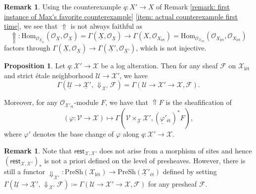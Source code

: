 \documentclass[11pt]{amsart}
\theoremstyle{definition}
\theoremstyle{definition}
\newtheorem{proposition}[theorem]{Proposition}
\newtheorem{remark}[theorem]{Remark}
\DeclareMathOperator{\arrowdown}{\!\Downarrow\!}
\newcommand{\cF}{\mathcal{F}}
\newcommand{\cO}{\mathcal{O}}
\newcommand{\cU}{\mathcal{U}}
\newcommand{\cV}{\mathcal{V}}
\newcommand{\cX}{\mathcal{X}}
\newcommand{\LogO}[1]{\mathcal{O}_{{#1}_\text{l\'et}}}
\newcommand{\ul}[1]{\underline{#1}}
\newcommand{\cal}{\mathcal}
\def\cF{{\cal F}}
\def\cO{{\cal O}}
\def\cU{{\cal U}}
\def\cV{{\cal V}}
\def\cX{{\cal X}}
\begin{document}
\begin{remark}
    Using the counterexample $q\colon X'\rightarrow X$ of Remark \ref{remark: first instance of Max's favorite counterexample} \eqref{item: actual counterexample first time}, we see that $\Uparrow$ is not always faithful as $$\Uparrow\colon \text{Hom}_{\cO_{\ul{X}_{\text{\'et}}}}(\cO_{\ul{X}},\cO_{\ul{X}}) = \Gamma(\ul{X},\cO_{\ul{X}})\longrightarrow \Gamma(X,\LogO{X}) = \text{Hom}_{\LogO{\cX}}(\LogO{X},\LogO{X})$$ factors through $\Gamma(\ul{X},\cO_{\ul{X}})\rightarrow \Gamma(\ul{X}',\cO_{\ul{X}'})$, which is not injective.
\end{remark}
\begin{proposition}\label{prop: explicit description of up and down}
Let $q\colon \mathcal{X'}\rightarrow \mathcal{X}$ be a log alteration. Then for any sheaf $\mathcal{F}$ on $\mathcal{X}_{\text{l\'et}}$ and strict \'etale neighborhood $\cU\rightarrow \mathcal{X'}$, we have 
\[\Gamma(\ul{\cU}\rightarrow \ul{\mathcal{X}}',\arrowdown_{\mathcal{X'}}\mathcal{F})=\Gamma(\cU\rightarrow \mathcal{X'}\rightarrow \mathcal{X},\mathcal{F}).\]

Moreover, for any $\mathcal{O}_{\ul{\mathcal{X}}'_{\text{\'et}}}$-module $F$, we have that $\Uparrow \!\! F$ is the sheafification of 
\[(\varphi\colon \cV\rightarrow\mathcal{X})\longmapsto \Gamma(\ul{\cV\times_\mathcal{X} \mathcal{X'}}, (\ul{\varphi}{}'_{\text{\'et}})^*{} F),\]
where $\varphi'$ denotes the base change of $\varphi$ along $q\colon\mathcal{X'}\rightarrow \mathcal{X}$.
\end{proposition}
\begin{remark}\label{remark: down arrow on presheaves}
    Note that $\mathsf{rest}_{\cX,\cX'}$ does not arise from a morphism of sites and hence $(\mathsf{rest}_{\cX,\cX'})_*$ is not a priori defined on the level of presheaves. However, there is still a functor $\Downarrow_{\cX'}\colon \text{PreSh}(\cX_{\text{l\'et}})\rightarrow\text{PreSh}(\ul{\cX}{}'_{\text{\'et}})$ defined by setting $\Gamma(\ul{\cU}\rightarrow \ul{\mathcal{X}}',\arrowdown_{\mathcal{X'}}\mathcal{F})\coloneqq \Gamma(\cU\rightarrow \mathcal{X'}\rightarrow \mathcal{X},\mathcal{F})$ for any presheaf $\cF$.
\end{remark}
\end{document}

